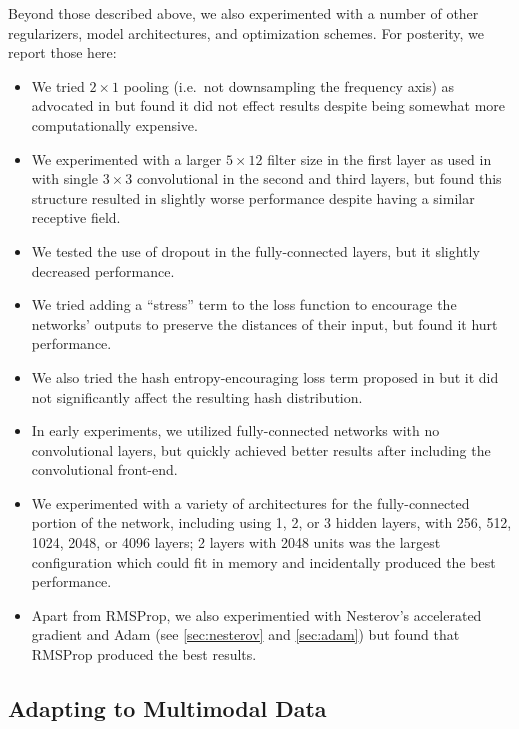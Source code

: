 Beyond those described above, we also experimented with a number of other regularizers, model architectures, and optimization schemes.
For posterity, we report those here:
\begin{itemize}
\item We tried $2 \times 1$ pooling (i.e.\ not downsampling the frequency axis) as advocated in \cite{humphrey2012rethinking} but found it did not effect results despite being somewhat more computationally expensive.
\item We experimented with a larger $5 \times 12$ filter size in the first layer as used in \cite{raffel2015large} with single $3 \times 3$ convolutional in the second and third layers, but found this structure resulted in slightly worse performance despite having a similar receptive field.
\item We tested the use of dropout \cite{hinton2012improving} in the fully-connected layers, but it slightly decreased performance.
\item We tried adding a ``stress'' \cite{kruskal1964multidimensional} term to the loss function to encourage the networks' outputs to preserve the distances of their input, but found it hurt performance.
\item We also tried the hash entropy-encouraging loss term proposed in \cite[equation (3)]{yang2015supervised} but it did not significantly affect the resulting hash distribution.
\item In early experiments, we utilized fully-connected networks with no convolutional layers, but quickly achieved better results after including the convolutional front-end.
\item We experimented with a variety of architectures for the fully-connected portion of the network, including using 1, 2, or 3 hidden layers, with 256, 512, 1024, 2048, or 4096 layers; 2 layers with 2048 units was the largest configuration which could fit in memory and incidentally produced the best performance.
\item Apart from RMSProp, we also experimentied with Nesterov's accelerated gradient \cite{nesterov1983method} and Adam \cite{kingma2015adam} (see \cref{sec:nesterov} and \cref{sec:adam}) but found that RMSProp produced the best results.
\end{itemize}

\subsection{Adapting to Multimodal Data}
\label{sec:multimodal}

